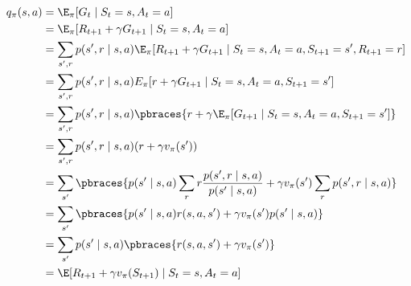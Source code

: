 \begin{solution}

\begin{align*}
    q_\pi(s, a)
    & =
    \E_\pi[G_t \mid S_t = s, A_t = a] \\
    & =
    \E_\pi[R_{t+1} + \gamma G_{t+1} \mid S_t = s, A_t = a] \\
    & =
    \sum_{s^\prime, r}
        p(s^\prime, r \mid s, a)
        \E_\pi[R_{t+1} + \gamma G_{t+1} \mid S_t = s, A_t = a, S_{t+1} = s^\prime, R_{t+1} = r] \\
    & =
    \sum_{s^\prime, r}
        p(s^\prime, r \mid s, a)
        E_\pi[r + \gamma G_{t+1} \mid S_t = s, A_t = a, S_{t+1} = s^\prime] \\
    & =
    \sum_{s^\prime, r}
        p(s^\prime, r \mid s, a)
        \pbraces
        {
            r + \gamma \E_\pi[G_{t+1} \mid S_t = s, A_t = a, S_{t+1} = s^\prime]
        } \\
    & =
    \sum_{s^\prime, r}
        p(s^\prime, r \mid s, a)
        (r + \gamma v_\pi(s^\prime)) \\
    & =
    \sum_{s^\prime}
        \pbraces
        {
            p(s^\prime \mid s, a)
            \sum_r
                r
                \frac
                {
                    p(s^\prime, r \mid s, a)
                }{
                    p(s^\prime \mid s, a)
                }
            +
            \gamma v_\pi(s^\prime)
            \sum_r
                p(s^\prime, r \mid s, a)
        } \\
    & =
    \sum_{s^\prime}
        \pbraces
        {
            p(s^\prime \mid s, a)
            r(s, a, s^\prime)
            +
            \gamma v_\pi(s^\prime)
            p(s^\prime \mid s, a)
        } \\
    & =
    \sum_{s^\prime}
        p(s^\prime \mid s, a)
        \pbraces
        {
            r(s, a, s^\prime)
            +
            \gamma v_\pi(s^\prime)
        } \\
    & =
    \E[R_{t+1} + \gamma v_\pi(S_{t+1}) \mid S_t = s, A_t = a]
\end{align*}

\end{solution}

